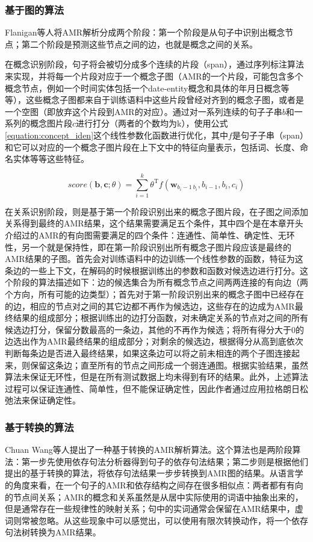 \documentclass[master, winfont]{njuthesis}
\begin{document}
\subsubsection{基于图的算法}
Flanigan等人\cite{Flanigan2014}将AMR解析分成两个阶段：第一个阶段是从句子中识别出概念节点；第二个阶段是预测这些节点之间的边，也就是概念之间的关系。

在概念识别阶段，句子将会被切分成多个连续的片段（span），通过序列标注算法来实现，并将每一个片段对应于一个概念子图（AMR的一个片段，可能包含多个概念节点，例如一个时间实体包括一个date-entity概念和具体的年月日概念等等），这些概念子图都来自于训练语料中这些片段曾经对齐到的概念子图，或者是一个空图（即放弃这个片段到AMR的对应）。通过对一系列连续的句子子串\textbf{$b$}和一系列的概念图片段\textbf{$c$}进行打分（两者的个数均为k），使用公式\ref{equation:concept_iden}这个线性参数化函数进行优化，其中\textbf{$f$}是句子子串（span）和它可以对应的一个概念子图片段在上下文中的特征向量表示，包括词、长度、命名实体等等这些特征。

\begin{equation}
	\label{concept_iden}
	score(\textbf{b}, \textbf{c}; \textbf{$\theta$})=\sum_{i=1}^{k}\textbf{$\theta$}^\mathrm{T}f(\textbf{w}_{b_i-1\:b_i}, b_{i-1}, b_i, c_i)
\end{equation}

在关系识别阶段，则是基于第一个阶段识别出来的概念子图片段，在子图之间添加关系得到最终的AMR结果，这个结果需要满足五个条件，其中四个是在本章开头介绍过的AMR的有向图需要满足的四个条件：连通性、简单性、确定性、无环性，另一个就是保持性，即在第一阶段识别出所有概念子图片段应该是最终的AMR结果的子图。首先会对训练语料中的边训练一个线性参数的函数，特征为这条边的一些上下文，在解码的时候根据训练出的参数和函数对候选边进行打分。这个阶段的算法描述如下：边的候选集合为所有概念节点之间两两连接的有向边（两个方向，所有可能的边类型）；首先对于第一阶段识别出来的概念子图中已经存在的边，相应的节点对之间的其它边都不再作为候选边，这些存在的边成为AMR最终结果的组成部分；根据训练出的边打分函数，对未确定关系的节点对之间的所有候选边打分，保留分数最高的一条边，其他的不再作为候选；将所有得分大于0的边选出作为AMR最终结果的组成部分；对剩余的候选边，根据得分从高到底依次判断每条边是否进入最终结果，如果这条边可以将之前未相连的两个子图连接起来，则保留这条边；直至所有的节点之间形成一个弱连通图。根据实验结果，虽然算法未保证无环性，但是在所有测试数据上均未得到有环的结果。此外，上述算法过程可以保证连通性、简单性，但不能保证确定性，因此作者通过应用拉格朗日松弛法来保证确定性。

\subsubsection{基于转换的算法}
Chuan Wang等人\cite{Wang2015}提出了一种基于转换的AMR解析算法。这个算法也是两阶段算法：第一步先使用依存句法分析器得到句子的依存句法结果；第二步则是根据他们提出的基于转换的算法，将依存句法结果一步步转换到AMR图的结果。从语言学的角度来看，在一个句子的AMR和依存结构之间存在很多相似点：两者都有有向的节点间关系；AMR的概念和关系虽然是从居中实际使用的词语中抽象出来的，但是通常存在一些规律性的映射关系；句中的实词通常会保留在AMR结果中，虚词则常被忽略。从这些现象中可以感觉出，可以使用有限次转换动作，将一个依存句法树转换为AMR结果。
\end{document}
